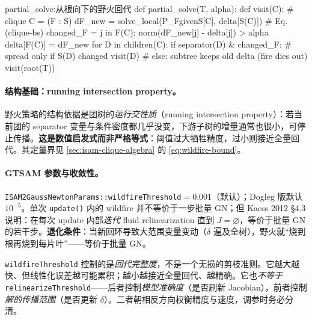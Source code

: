\begin{algo}
\label{algo:wildfire}
\begin{codebox}[Python]{partial\_solve:从根向下的野火回代}
def partial_solve(T, alpha):
    def visit(C):                          # clique C = (F : S)
        dF_new = solve_local(P_FgivenS[C], delta[S(C)])  # Eq. (clique-bs)
        changed_F = {j in F(C):
                     norm(dF_new[j] - delta[j]) > alpha}
        delta[F(C)] = dF_new
        for D in children(C):
            if separator(D) & changed_F:   # spread only if S(D) changed
                visit(D)
            # else: subtree keeps old delta (fire dies out)
    visit(root(T))
\end{codebox}
\end{algo}

\paragraph{结构基础：running intersection property。}
野火策略的结构依据是团树的\emph{运行交性质}（running intersection property）：若当前团的 separator 变量与条件密度都几乎没变，下游子树的增量通常也很小，可停止传播。\textbf{这是数值启发式而非严格等式}：阈值过大牺牲精度，过小则接近全量回代。其定量界见 \cref{sec:isam-clique-algebra} 的 \cref{eq:wildfire-bound}。

\paragraph{GTSAM 参数与收敛性。}
\texttt{ISAM2GaussNewtonParams::wildfireThreshold}$=0.001$（默认）；Dogleg 版默认 $10^{-5}$。单次 \texttt{update()} 内的 wildfire 并不等价于一步批量 GN；但 Kaess 2012 §4.3\cite{kaess2012isam2} 说明：在每次 update 内部\emph{迭代} fluid relinearization 直到 $J=\varnothing$，等价于批量 GN 的若干步。\textbf{退化条件}：当新回环导致大范围变量变动（$\delta$ 遍及全树），野火就“烧到根再烧到每片叶”——等价于批量 GN。

\begin{pitfall}
\texttt{wildfireThreshold} 控制的是\emph{回代完整度}，不是一个无损的剪枝准则。它越大越快、但线性化误差越可能累积；越小越接近全量回代、越精确。它也\emph{不等于} \texttt{relinearizeThreshold}——后者控制\emph{模型准确度}（是否刷新 Jacobian），前者控制\emph{解的传播范围}（是否更新 $\delta$）。二者朝相反方向权衡精度与速度，调参时务必分清。
\end{pitfall}

